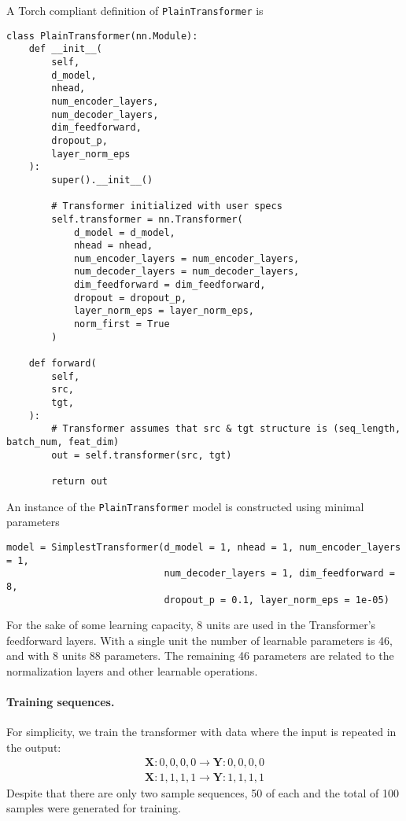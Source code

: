 \documentclass[final]{article}
\begin{document}
A Torch compliant definition of \texttt{PlainTransformer} is
\begin{lstlisting}
class PlainTransformer(nn.Module):
    def __init__(
        self,
        d_model,
        nhead,
        num_encoder_layers,
        num_decoder_layers,
        dim_feedforward,
        dropout_p,
        layer_norm_eps
    ):
        super().__init__()

        # Transformer initialized with user specs
        self.transformer = nn.Transformer(
            d_model = d_model,
            nhead = nhead,
            num_encoder_layers = num_encoder_layers,
            num_decoder_layers = num_decoder_layers,
            dim_feedforward = dim_feedforward,
            dropout = dropout_p,
            layer_norm_eps = layer_norm_eps,
            norm_first = True
        )

    def forward(
        self,
        src,
        tgt,
    ):
        # Transformer assumes that src & tgt structure is (seq_length, batch_num, feat_dim)
        out = self.transformer(src, tgt)

        return out
\end{lstlisting}

An instance of the \texttt{PlainTransformer} model is constructed
using minimal parameters
\begin{lstlisting}
model = SimplestTransformer(d_model = 1, nhead = 1, num_encoder_layers = 1,
                            num_decoder_layers = 1, dim_feedforward = 8,
                            dropout_p = 0.1, layer_norm_eps = 1e-05)
\end{lstlisting}
For the sake of some learning capacity, 8 units are used in the
Transformer's feedforward layers. With a single unit the number of
learnable parameters is 46, and with 8 units 88 parameters. The
remaining 46 parameters are related to the normalization layers and
other learnable operations.

\paragraph{Training sequences.} For simplicity, we train the
transformer with data where the input is repeated in the output:
\begin{displaymath}
  \begin{split}
    \mathbf{X}: 0,0,0,0 \rightarrow \mathbf{Y}: 0,0,0,0\\
    \mathbf{X}: 1,1,1,1 \rightarrow \mathbf{Y}: 1,1,1,1
  \end{split}
\end{displaymath}
Despite that there are only two sample sequences, 50 of each and the total of
100 samples were generated for training.
\end{document}
